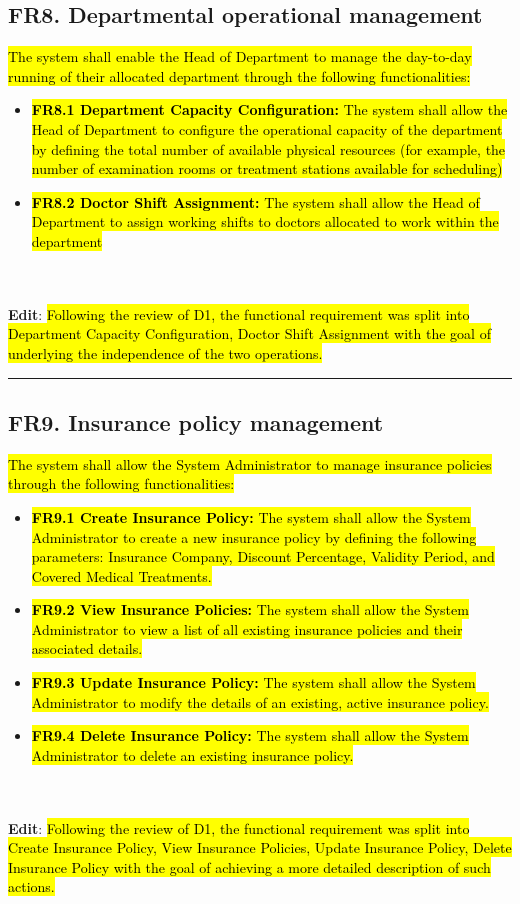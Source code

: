 \documentclass[12pt, a4paper]{article}
\begin{document}
\subsection{FR8. Departmental operational management} \label{FR8}
\hl{The system shall enable the Head of Department to manage the day-to-day running of their allocated department through the following functionalities:}
\begin{itemize}
    \item \hl{\textbf{FR8.1 Department Capacity Configuration:} The system shall allow the Head of Department to configure the operational capacity of the department by defining the total number of available physical resources (for example, the number of examination rooms or treatment stations available for scheduling)}
    \item \hl{\textbf{FR8.2 Doctor Shift Assignment:} The system shall allow the Head of Department to assign working shifts to doctors allocated to work within the department}
\end{itemize}
\\
\\ \textbf{Edit}:
\hl{Following the review of D1, the functional requirement was split into Department Capacity Configuration, Doctor Shift Assignment with the goal of underlying the independence of the two operations.}

\noindent\rule{\textwidth}{0.4pt}
\medskip
\subsection{FR9. Insurance policy management} \label{FR9}
\hl{The system shall allow the System Administrator to manage insurance policies through the following functionalities:}
\begin{itemize}
    \item \hl{\textbf{FR9.1 Create Insurance Policy:} The system shall allow the System Administrator to create a new insurance policy by defining the following parameters: Insurance Company, Discount Percentage, Validity Period, and Covered Medical Treatments.}
    \item \hl{\textbf{FR9.2 View Insurance Policies:} The system shall allow the System Administrator to view a list of all existing insurance policies and their associated details.}
    \item \hl{\textbf{FR9.3 Update Insurance Policy:} The system shall allow the System Administrator to modify the details of an existing, active insurance policy.}
    \item \hl{\textbf{FR9.4 Delete Insurance Policy:} The system shall allow the System Administrator to delete an existing insurance policy.}
\end{itemize}
\\
\\ \textbf{Edit}:
\hl{Following the review of D1, the functional requirement was split into Create Insurance Policy, View Insurance Policies, Update Insurance Policy, Delete Insurance Policy with the goal of achieving a more detailed description of such actions.}
\end{document}
